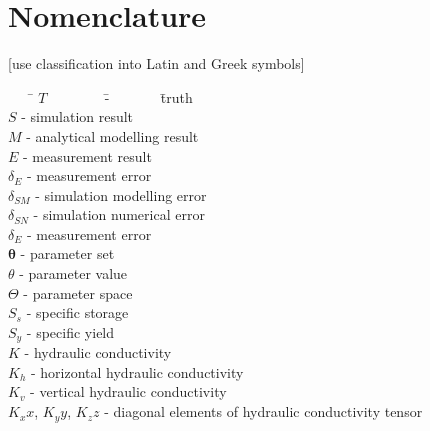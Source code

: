 
\chapter*{Nomenclature}
\label{Chap-Nomenclature}

[use classification into Latin and Greek symbols]

\begin{tabbing}

    ~~~ \= $T$ ~~~~~~~ \= - ~~~~~~ \= truth\\

    \> $S$ \> - \> simulation result\\

    \> $M$ \> - \> analytical modelling result\\

    \> $E$ \> - \> measurement result\\

    \> $\delta_E$ \> - \> measurement error\\

    \> $\delta_{SM}$ \> - \> simulation modelling error\\

    \> $\delta_{SN}$ \> - \> simulation numerical error\\

    \> $\delta_E$ \> - \> measurement error\\

    \> $\bm{\theta}$ \> - \> parameter set\\

    \> $\theta$ \> - \> parameter value\\

    \> $\Theta$ \> - \> parameter space\\

    \> $S_s$ \> - \> specific storage\\

    \> $S_y$ \> - \> specific yield\\

    \> $K$ \> - \> hydraulic conductivity\\

    \> $K_h$ \> - \> horizontal hydraulic conductivity\\

    \> $K_v$ \> - \> vertical hydraulic conductivity\\

    \> $K_xx$, $K_yy$, $K_zz$ \> - \> diagonal elements of hydraulic conductivity tensor\\


\end{tabbing}
